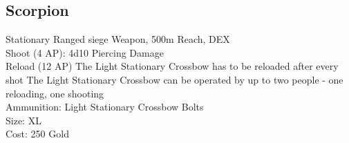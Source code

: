 \subsection{Scorpion}\label{weapon:scorpion}
Stationary Ranged siege Weapon, 500m Reach, DEX\\
Shoot (4 AP): 4d10 Piercing Damage\\
Reload (12 AP) The Light Stationary Crossbow has to be reloaded after every shot
The Light Stationary Crossbow can be operated by up to two people - one reloading, one shooting\\
Ammunition: Light Stationary Crossbow Bolts\\
Size: XL\\
Cost: 250 Gold\\